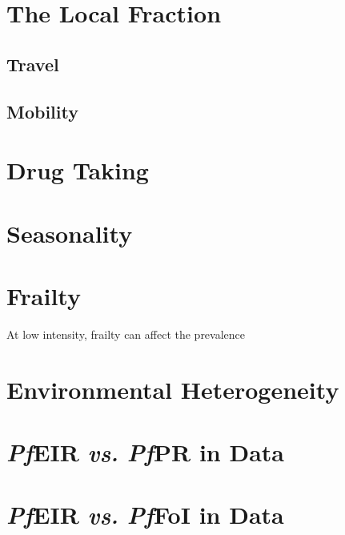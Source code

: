 \documentclass[
]{book}
\begin{document}
\hypertarget{the-local-fraction}{%
\section{The Local Fraction}\label{the-local-fraction}}

\hypertarget{travel-1}{%
\subsection{Travel}\label{travel-1}}

\hypertarget{mobility-1}{%
\subsection{Mobility}\label{mobility-1}}

\hypertarget{drug-taking}{%
\section{Drug Taking}\label{drug-taking}}

\hypertarget{seasonality-1}{%
\section{Seasonality}\label{seasonality-1}}

\hypertarget{frailty}{%
\section{Frailty}\label{frailty}}

At low intensity, frailty can affect the prevalence

\hypertarget{environmental-heterogeneity-1}{%
\section{Environmental Heterogeneity}\label{environmental-heterogeneity-1}}

\hypertarget{pfeir-vs.-pfpr-in-data}{%
\section{\texorpdfstring{\emph{Pf}EIR \emph{vs.} \emph{Pf}PR in Data}{PfEIR vs. PfPR in Data}}\label{pfeir-vs.-pfpr-in-data}}

\hypertarget{pfeir-vs.-pffoi-in-data}{%
\section{\texorpdfstring{\emph{Pf}EIR \emph{vs.} \emph{Pf}FoI in Data}{PfEIR vs. PfFoI in Data}}\label{pfeir-vs.-pffoi-in-data}}
\end{document}
